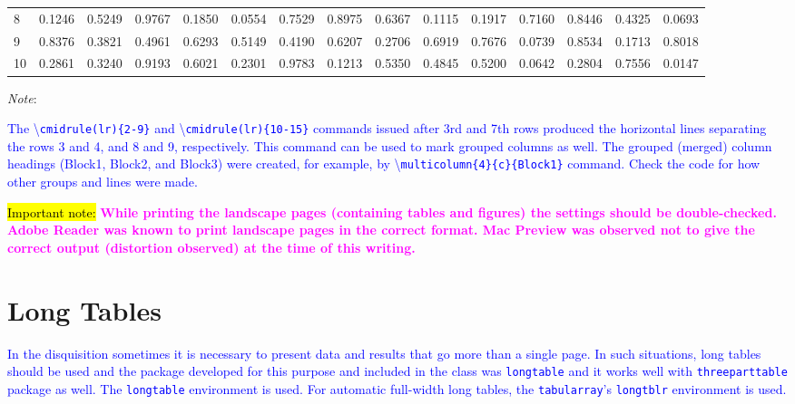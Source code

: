\documentclass[phd]{ndsu-thesis-2022}
\newcommand\italk[1]{\textcolor{blue}{#1}}  %
\newcommand\cmd[1]{\textbackslash\texttt{#1}}  %
\newcommand\vb[1]{\textcolor{blue}{\texttt{#1}}}%
\begin{document}
\begin{landscape}
\begin{table}[p]
{\begin{tabular}{l  rrrr  cccc  llll  rr}
8 & 0.1246 & 0.5249 & 0.9767 & 0.1850 & 0.0554 & 0.7529 & 0.8975 & 0.6367 & 0.1115 & 0.1917 & 0.7160 & 0.8446 & 0.4325 & 0.0693 \\
\cmidrule(lr){10-15}
9 & 0.8376 & 0.3821 & 0.4961 & 0.6293 & 0.5149 & 0.4190 & 0.6207 & 0.2706 & 0.6919 & 0.7676 & 0.0739 & 0.8534 & 0.1713 & 0.8018 \\
10 & 0.2861 & 0.3240 & 0.9193 & 0.6021 & 0.2301 & 0.9783 & 0.1213 & 0.5350 & 0.4845 & 0.5200 & 0.0642 & 0.2804 & 0.7556 & 0.0147 \\
\bottomrule
\end{tabular}
}    
\begin{tablenotes}[flushleft]
\footnotesize
\item \hspace{-1ex} \emph{Note}: \italk{The \cmd{cmidrule(lr)\{2-9\}} and \cmd{cmidrule(lr)\{10-15\}} commands issued after 3rd and 7th rows produced the horizontal lines separating the rows 3 and 4, and 8 and 9, respectively. This command can be used to mark grouped columns as well. The grouped (merged) column headings (Block1, Block2, and Block3) were created, for example, by \cmd{multicolumn\{4\}\{c\}\{Block1\}} command. Check the code for how other groups and lines were made.
\item \vspace{4ex}
\italk{\hl{Important note:}} \textcolor{magenta}{\bfseries While printing the landscape pages (containing tables and figures) the settings should be double-checked. Adobe Reader was known to print landscape pages in the correct format. Mac Preview was observed not to give the correct output (distortion observed) at the time of this writing.}
}  
\end{tablenotes}  
\label{tab212}
\end{table}
\end{landscape}

\section{Long Tables}
\italk{In the disquisition sometimes it is necessary to present data and results that go more than a single page. In such situations, long tables should be used and the package developed for this purpose and included in the class was 
\vb{longtable} and it works well with \vb{threeparttable} package as well. The \vb{longtable} environment is used. For automatic full-width long tables, the \vb{tabularray}'s \vb{longtblr} environment is used.} 
\end{document}

